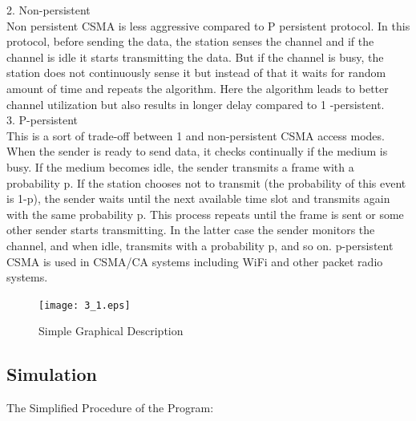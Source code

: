 \documentclass[11pt,a4paper]{report}
\begin{document}
2. Non-persistent \\
Non persistent CSMA is less aggressive compared to P persistent protocol. In this protocol, before sending the data, the station senses the channel and if the channel is idle it starts transmitting the data. But if the channel is busy, the station does not continuously sense it but instead of that it waits for random amount of time and repeats the algorithm. Here the algorithm leads to better channel utilization but also results in longer delay compared to 1 -persistent. \\

3. P-persistent \\
This is a sort of trade-off between 1 and non-persistent CSMA access modes. When the sender is ready to send data, it checks continually if the medium is busy. If the medium becomes idle, the sender transmits a frame with a probability p. If the station chooses not to transmit (the probability of this event is 1-p), the sender waits until the next available time slot and transmits again with the same probability p. This process repeats until the frame is sent or some other sender starts transmitting. In the latter case the sender monitors the channel, and when idle, transmits with a probability p, and so on. p-persistent CSMA is used in CSMA/CA systems including WiFi and other packet radio systems. \\

\begin{figure}
\centering
\texttt{[image: 3\_1.eps]}
\caption{Simple Graphical Description}
\end{figure}

\subsection*{Simulation}
The Simplified Procedure of the Program: \\
\end{document}
